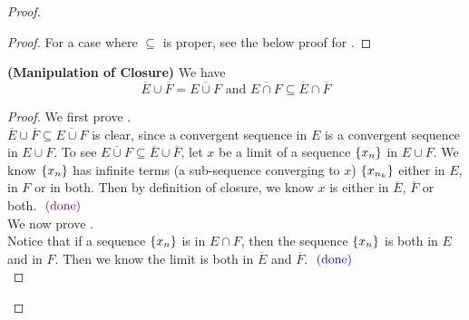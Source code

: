 \documentclass{report}
\begin{document}
\begin{proof}
\begin{proof}
For a case where $\subseteq$ is proper, see the below proof for .
\end{proof}
\begin{theorem}
\label{3.2.4}
\textbf{(Manipulation of Closure)} We have
\begin{equation}
\overline{E}\cup \overline{F}=\overline{E\cup F}\text{ and }\overline{E\cap F}\subseteq \overline{E}\cap \overline{F}
\end{equation}
\end{theorem}
\begin{proof}
We first prove .\\

$\overline{E}\cup \overline{F}\subseteq \overline{E\cup F}$ is clear, since a convergent sequence in $E$ is a convergent sequence in $E\cup F$. To see $\overline{E\cup F}\subseteq \overline{E}\cup \overline{F}$, let $x$ be a limit of a sequence  $\{ x_n \}$ in $E\cup F$. We know $\{ x_n \}$ has infinite terms (a sub-sequence converging to $x$) $\{ x_{n_k} \}$ either in $E$, in $F$ or in both. Then by definition of closure, we know $x$ is either in $\overline{E}$, $\overline{F}$ or both. $\textcolor{violet}{\text{ (done) }}$\\


We now prove .\\

Notice that if a sequence $\{ x_n \}$ is in $E\cap F$, then the sequence $\{ x_n \}$ is both in $E$ and in $F$. Then we know the limit is both in  $\overline{E}$ and $\overline{F}$. $\textcolor{blue}{\text{ (done) }}$\\


\end{proof}
\end{proof}
\end{document}
